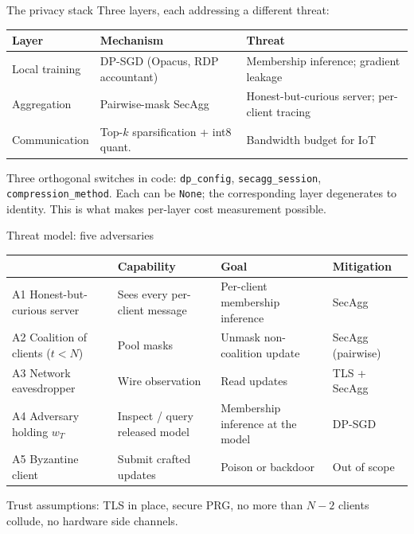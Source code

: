 \documentclass[10pt,aspectratio=169]{beamer}
\begin{document}
\begin{frame}{The privacy stack}
  Three layers, each addressing a different threat:
  \vspace{0.5em}
  \begin{table}
    \centering
    \begin{tabular}{lll}
      \toprule
      \textbf{Layer} & \textbf{Mechanism} & \textbf{Threat} \\
      \midrule
      Local training         & DP-SGD (Opacus, RDP accountant)     & Membership inference; gradient leakage \\
      Aggregation            & Pairwise-mask SecAgg                & Honest-but-curious server; per-client tracing \\
      Communication          & Top-$k$ sparsification + int8 quant. & Bandwidth budget for IoT \\
      \bottomrule
    \end{tabular}
  \end{table}
  \vspace{0.5em}
  Three orthogonal switches in code: \texttt{dp\_config}, \texttt{secagg\_session}, \texttt{compression\_method}. Each can be \texttt{None}; the corresponding layer degenerates to identity. This is what makes per-layer cost measurement possible.
\end{frame}

\begin{frame}{Threat model: five adversaries}
  \begin{table}
    \centering
    \scriptsize
    \begin{tabular}{lp{3.6cm}p{3.5cm}p{3.5cm}}
      \toprule
      & \textbf{Capability} & \textbf{Goal} & \textbf{Mitigation} \\
      \midrule
      A1 Honest-but-curious server  & Sees every per-client message             & Per-client membership inference   & SecAgg \\
      A2 Coalition of clients ($t < N$) & Pool masks                              & Unmask non-coalition update       & SecAgg (pairwise) \\
      A3 Network eavesdropper       & Wire observation                          & Read updates                      & TLS + SecAgg \\
      A4 Adversary holding $w_T$    & Inspect / query released model            & Membership inference at the model & DP-SGD \\
      A5 Byzantine client           & Submit crafted updates                    & Poison or backdoor                & \textcolor{red!70!black}{Out of scope} \\
      \bottomrule
    \end{tabular}
  \end{table}
  \vspace{0.4em}
  Trust assumptions: TLS in place, secure PRG, no more than $N - 2$ clients collude, no hardware side channels.
\end{frame}
\end{document}
